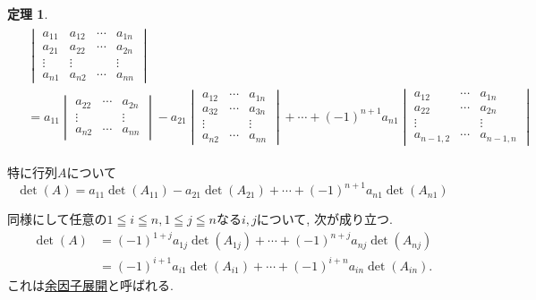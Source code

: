 \documentclass[dvipdfmx,a4paper,11pt]{article}
\theoremstyle{definition}
\newtheorem{thm}{定理}
\begin{document}
 \begin{tcolorbox}[
    colback = white,
    colframe = green!35!black,
    fonttitle = \bfseries,
    breakable = true]
    \begin{thm}
    \label{thm-cofactor}
\begin{align*}
\begin{split}
&\begin{vmatrix}
a_{11} & a_{12} & \cdots & a_{1n} \\
a_{21} & a_{22} & \cdots & a_{2n} \\
\vdots & \vdots & & \vdots \\
a_{n1} & a_{n2} & \cdots & a_{nn}
\end{vmatrix}\\
&=
a_{11} 
\begin{vmatrix}
a_{22} & \cdots & a_{2n} \\
\vdots & & \vdots \\
a_{n2} & \cdots & a_{nn}
\end{vmatrix}
- a_{21}
\begin{vmatrix}
a_{12} & \cdots & a_{1n} \\
a_{32} & \cdots & a_{3n} \\
\vdots & & \vdots \\
a_{n2} & \cdots & a_{nn}
\end{vmatrix}
+ \cdots + (-1)^{n+1} a_{n1}
\begin{vmatrix}
a_{12} & \cdots & a_{1n} \\
a_{22} & \cdots & a_{2n} \\
\vdots & & \vdots \\
a_{n-1,2} & \cdots & a_{n-1,n}
\end{vmatrix}
\end{split}
\end{align*}

特に行列$A$について
$$
\det(A) =a_{11}\det(A_{11}) - a_{21}\det(A_{21})+ \cdots +(-1)^{n+1}a_{n1}\det(A_{n1}) 
$$

同様にして任意の$1 \leqq i \leqq n, 1 \leqq j\leqq n$なる$i,j$について, 次が成り立つ.
 \begin{align*}
 \det(A) & =(-1)^{1+j}a_{1j}\det(A_{1j}) + \cdots +(-1)^{n+j}a_{nj}\det(A_{nj}) 
 \\
 &=(-1)^{i+1}a_{i1}\det(A_{i1}) + \cdots +(-1)^{i+n}a_{in}\det(A_{in}).
  \end{align*}
  これは\underline{余因子展開}と呼ばれる. 
     \end{thm}
 \end{tcolorbox}
\end{document}
